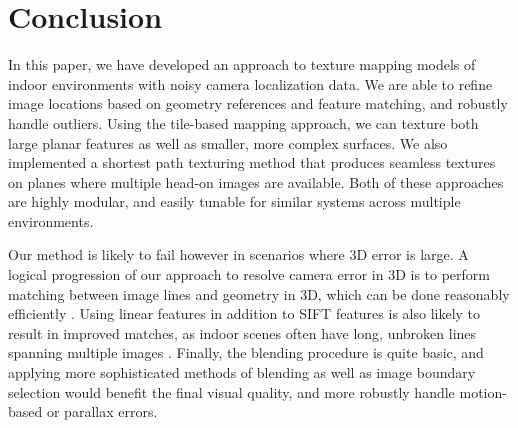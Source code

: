 \documentclass[]{spie}  %
\begin{document}
\section{Conclusion}
\label{sec:conclusion}

In this paper, we have developed an approach to texture mapping models
of indoor environments with noisy camera localization data. We are
able to refine image locations based on geometry references and
feature matching, and robustly handle outliers. Using the tile-based
mapping approach, we can texture both large planar features as well as
smaller, more complex surfaces. We also implemented a shortest path
texturing method that produces seamless textures on planes where
multiple head-on images are available. Both of these approaches are
highly modular, and easily tunable for similar systems across multiple
environments.

Our method is likely to fail however in scenarios where 3D error is
large. A logical progression of our approach to resolve camera error
in 3D is to perform matching between image lines and geometry in 3D,
which can be done reasonably efficiently \cite{linebased,
  rectangularstructures}. Using linear features in addition to SIFT
features is also likely to result in improved matches, as indoor
scenes often have long, unbroken lines spanning multiple images
\cite{linearposeestimation}. Finally, the blending procedure is quite
basic, and applying more sophisticated methods of blending as well as
image boundary selection would benefit the final visual quality, and
more robustly handle motion-based or parallax errors.


\end{document}
